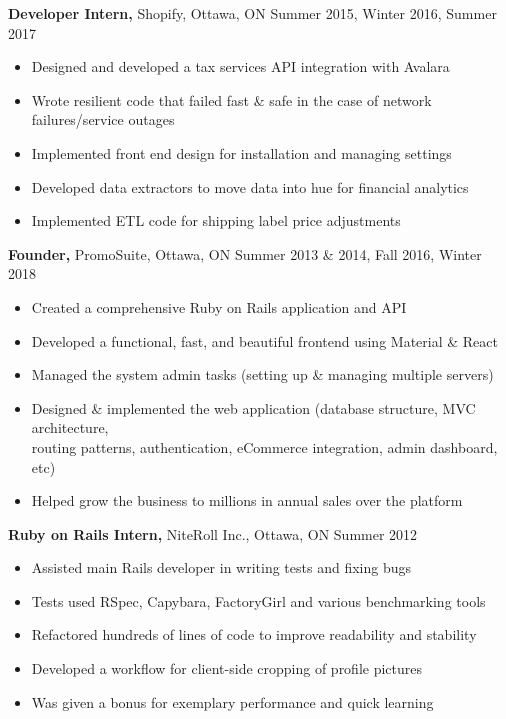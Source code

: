 \documentclass[line, centered]{res}
\begin{document}
\begin{resume}
 {\bf Developer Intern,} Shopify, Ottawa, ON \hfill Summer 2015, Winter 2016, Summer 2017\\[-8pt]
 \begin{itemize} \itemsep -2pt  %
 \item Designed and developed a tax services API integration with Avalara
 \item Wrote resilient code that failed fast \& safe in the case of network failures/service outages
 \item Implemented front end design for installation and managing settings
 \item Developed data extractors to move data into hue for financial analytics
 \item Implemented ETL code for shipping label price adjustments
 \end{itemize}

 {\bf Founder,} PromoSuite, Ottawa, ON \hfill Summer 2013 \& 2014, Fall 2016, Winter 2018\\[-8pt]
 \begin{itemize} \itemsep -2pt  %
 \item Created a comprehensive Ruby on Rails application and API
 \item Developed a functional, fast, and beautiful frontend using Material \& React
 \item Managed the system admin tasks (setting up \& managing multiple servers)
 \item Designed \& implemented the web application (database structure, MVC architecture,\\
 		routing patterns, authentication, eCommerce integration, admin dashboard, etc)
 \item Helped grow the business to millions in annual sales over the platform
 \end{itemize}


{\bf Ruby on Rails Intern,} NiteRoll Inc., Ottawa, ON \hfill Summer 2012
\begin{itemize} \itemsep -2pt
	\item Assisted main Rails developer in writing tests and fixing bugs
    \item Tests used RSpec, Capybara, FactoryGirl and various benchmarking tools
    \item Refactored hundreds of lines of code to improve readability and stability
    \item Developed a workflow for client-side cropping of profile pictures
    \item Was given a bonus for exemplary performance and quick learning
\end{itemize}



\end{resume}
\end{document}

